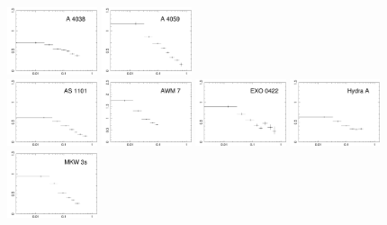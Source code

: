 \documentclass{aa}
\begin{document}
\begin{figure}[!]
                \includegraphics[width=0.236\textwidth,trim={0 0 0 0},clip]{fig_A4038_Fe.pdf}
                \includegraphics[width=0.236\textwidth,trim={0 0 0 0},clip]{fig_A4059_Fe.pdf} \\
                \includegraphics[width=0.236\textwidth,trim={0 0 0 0},clip]{fig_AS1101_Fe.pdf}
                \includegraphics[width=0.236\textwidth,trim={0 0 0 0},clip]{fig_AWM7_Fe.pdf}
                \includegraphics[width=0.236\textwidth,trim={0 0 0 0},clip]{fig_EXO0422_Fe.pdf}
                \includegraphics[width=0.236\textwidth,trim={0 0 0 0},clip]{fig_HydraA_Fe.pdf} \\
                \includegraphics[width=0.236\textwidth,trim={0 0 0 0},clip]{fig_MKW3s_Fe.pdf}

\end{figure}
\end{document}
